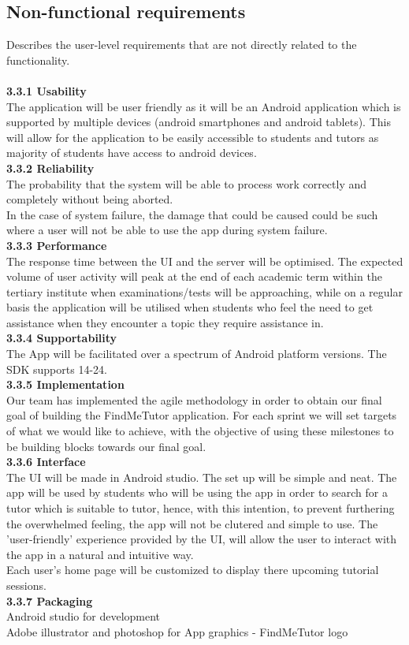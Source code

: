 \documentclass[12pt]{article}
\begin{document}
\subsection{Non-functional requirements}{
Describes the user-level requirements that are not directly related to the functionality. \\
\\\textbf{3.3.1 Usability}\\ 
The application will be user friendly as it will be an Android application which is supported by multiple devices (android smartphones and android tablets). This will allow for the application to be easily accessible to students and tutors as majority of students have access to android devices. 
\\\textbf{3.3.2 Reliability}\\
The probability that the system will be able to process work correctly and completely without being aborted.\\
In the case of system failure, the damage that could be caused could be such where a user will not be able to use the app during system failure.
\\\textbf{3.3.3 Performance}\\
The response time between the UI and the server will be optimised. The expected volume of user activity will peak at the end of each academic term within the tertiary institute when examinations/tests will be approaching, while on a regular basis the application will be utilised when students who feel the need to get assistance when they encounter a topic they require assistance in. 
\\\textbf{3.3.4 Supportability}\\
The App will be facilitated over a spectrum of Android platform versions. The SDK supports 14-24. \\
\textbf{3.3.5 Implementation}\\
Our team has implemented the agile methodology in order to obtain our final goal of building the FindMeTutor application. For each sprint we will set targets of what we would like to achieve, with the objective of using these milestones to be building blocks towards our final goal. 
\\\textbf{3.3.6 Interface}\\
The UI will be made in Android studio. The set up will be simple and neat. The app will be used by students who will be using the app in order to search for a tutor which is suitable to tutor, hence, with this intention, to prevent furthering the overwhelmed feeling, the app will not be clutered and simple to use. The 'user-friendly' experience provided by the UI, will allow the user to interact with the app in a natural and intuitive way. \\
Each user's home page will be customized to display there upcoming tutorial sessions.\\
\textbf{3.3.7 Packaging}\\
Android studio for development\\
Adobe illustrator and photoshop for App graphics - FindMeTutor logo\\
}
\end{document}
